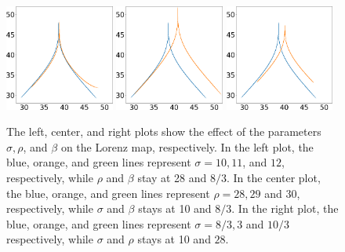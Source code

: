 \begin{figure}[H]
    \centering
    \includegraphics[width=0.32\textwidth]{figure/lorenz_zmax_sigma.png}
    \hspace{0.005\textwidth}
    \includegraphics[width=0.32\textwidth]{figure/lorenz_zmax_rho.png}
    \hspace{0.005\textwidth}
    \includegraphics[width=0.32\textwidth]{figure/lorenz_zmax_beta.png}
    \caption{The left, center, and right plots show the effect of the
    parameters $\sigma, \rho$, and $\beta$ on the Lorenz map, respectively.
    In the left plot, the blue, orange, and green lines represent
    $\sigma=10,11$, and $12$, respectively, while $\rho$ and $\beta$ stay
    at 28 and $8/3$.
    In the center plot, the blue, orange, and green lines represent
    $\rho=28,29$ and $30$, respectively, while $\sigma$ and $\beta$ stays at 10
    and $8/3$.
    In the right plot, the blue, orange, and green lines represent
    $\sigma=8/3,3$ and $10/3$ respectively, while $\sigma$ and $\rho$ stays at 10
    and $28$.}
    \label{fig:lorenz_params}
\end{figure}

